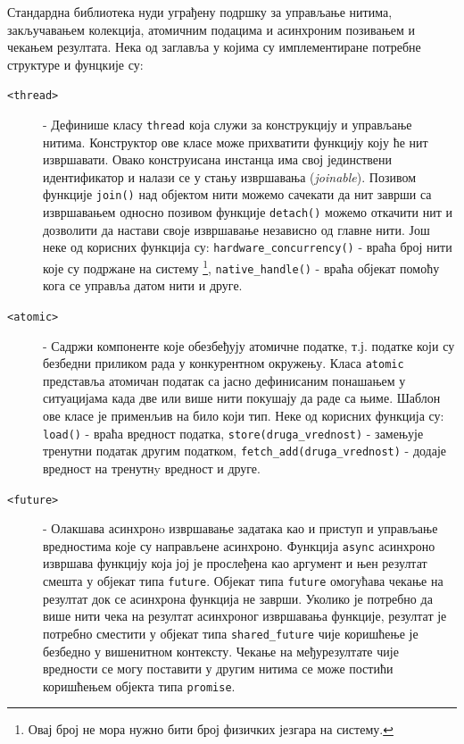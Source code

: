 \documentclass[12pt,oneside]{memoir}
\begin{document}
Стандардна библиотека нуди уграђену подршку за управљање нитима, закључавањем колекција, атомичним подацима и асинхроним позивањем и чекањем резултата. Нека од заглавља у којима су имплементиране потребне структуре и фунцкије су:
\begin{description}
	\item[\texttt{<thread>}] - Дефинише класу \texttt{thread} која служи за конструкцију и управљање нитима. Конструктор ове класе може прихватити функцију коју ће нит извршавати. Овако конструисана инстанца има свој јединствени идентификатор и налази се у стању извршавања (\textit{joinable}). Позивом функције \texttt{join()} над објектом нити можемо сачекати да нит заврши са извршавањем односно позивом функције \texttt{detach()} можемо откачити нит и дозволити да настави своје извршавање независно од главне нити. Још неке од корисних функција су: \texttt{hardware\_concurrency()} - враћа број нити које су подржане на систему \footnote{Овај број не мора нужно бити број физичких језгара на систему.}, \texttt{native\_handle()} - враћа објекат помоћу кога се управља датом нити и друге.
	\item[\texttt{<atomic>}] - Садржи компоненте које обезбеђују атомичне податке, т.ј. податке који су безбедни приликом рада у конкурентном окружењу. Класа \texttt{atomic} представља атомичан податак са јасно дефинисаним понашањем у ситуацијама када две или више нити покушају да раде са њиме. Шаблон ове класе је применљив на било који тип. Неке од корисних функција су: \texttt{load()} - враћа вредност податка, \texttt{store(druga\_vrednost)} - замењује тренутни податак другим податком, \texttt{fetch\_add(druga\_vrednost)} - додаје вредност на тренутнy вредност и друге.
	\item[\texttt{<future>}] - Олакшава асинхронo извршавање задатака као и приступ и управљање вредностима које су направљене асинхроно. Функција \texttt{async} асинхроно извршава функцију која јој је прослеђена као аргумент и њен резултат смешта у објекат типа \texttt{future}. Објекат типа \texttt{future} омогућава чекање на резултат док се асинхрона функција не заврши. Уколико је потребно да више нити чека на резултат асинхроног извршавања функције, резултат је потребно сместити у објекат типа \texttt{shared\_future} чије коришћење је безбедно у вишенитном контексту. Чекање на међурезултате чије вредности се могу поставити у другим нитима се може постићи коришћењем објекта типа \texttt{promise}.    
\end{description}
\end{document}
